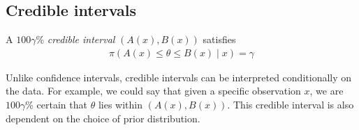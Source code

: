 \subsection{Credible intervals}
\begin{definition}
	A $100\gamma$\% \textit{credible interval} $(A(x), B(x))$ satisfies
	\begin{align*}
		\pi(A(x) \leq \theta \leq B(x) \mid x) = \gamma
	\end{align*}
\end{definition}
\begin{remark}
	Unlike confidence intervals, credible intervals can be interpreted conditionally on the data.
	For example, we could say that given a specific observation $x$, we are $100 \gamma$\% certain that $\theta$ lies within $(A(x), B(x))$.
	This credible interval is also dependent on the choice of prior distribution.
\end{remark}
